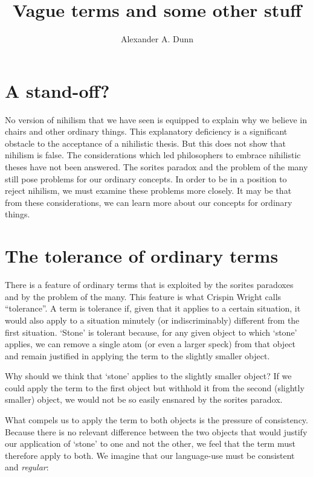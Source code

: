 \documentclass[11pt]{standalone}
\title{Vague terms and some other stuff}
\author{Alexander A. Dunn}
\begin{document}
\ifstandalone
\maketitle
\begin{spacing}{1.5}
\fi

\section{A stand-off?}
No version of nihilism that we have seen is equipped to explain why we
believe in chairs and other ordinary things.  This explanatory
deficiency is a significant obstacle to the acceptance of a nihilistic
thesis.  But this does not show that nihilism is false.  The
considerations which led philosophers to embrace nihilistic theses
have not been answered.  The sorites paradox and the problem of the
many still pose problems for our ordinary concepts.  In order to be in
a position to reject nihilism, we must examine these problems more
closely.  It may be that from these considerations, we can learn more
about our concepts for ordinary things.


\section{The tolerance of ordinary terms}
There is a feature of ordinary terms that is exploited by the sorites
paradoxes and by the problem of the many.  This feature is what
Crispin Wright calls ``tolerance''.  A term is tolerance if, given
that it applies to a certain situation, it would also apply to a
situation minutely (or indiscriminably) different from the first
situation.  `Stone' is tolerant because, for any given object to which
`stone' applies, we can remove a single atom (or even a larger speck)
from that object and remain justified in applying the term to the
slightly smaller object.

Why should we think that `stone' applies to the slightly smaller
object?  If we could apply the term to the first object but withhold
it from the second (slightly smaller) object, we would not be so
easily ensnared by the sorites paradox.

What compels us to apply the term to both objects is the pressure of
consistency.  Because there is no relevant difference between the two
objects that would justify our application of `stone' to one and not
the other, we feel that the term must therefore apply to both.  We
imagine that our language-use must be consistent and {\em regular}:


\end{spacing}
\end{document}
